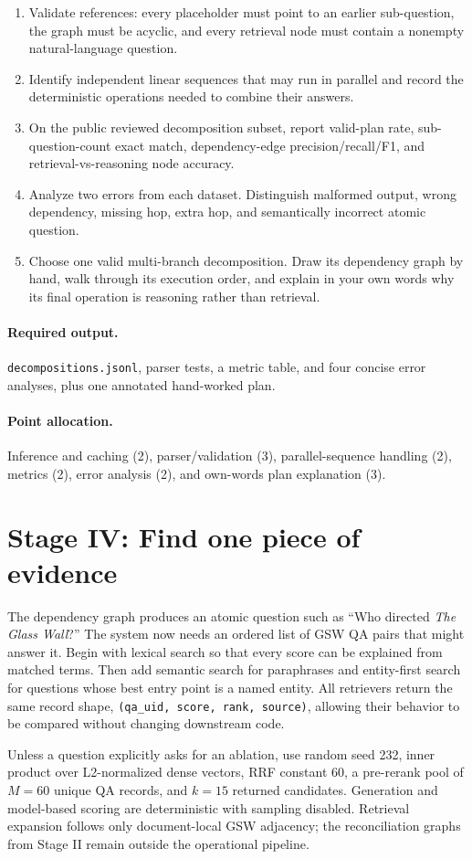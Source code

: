 \documentclass[11pt]{article}
\newcommand{\code}[1]{\texttt{#1}}
\newcommand{\deliverables}{\paragraph{Required output.}}
\newcommand{\grading}{\paragraph{Point allocation.}}
\begin{document}
\begin{enumerate}[label=(\alph*)]
  \item Validate references: every placeholder must point to an earlier
        sub-question, the graph must be acyclic, and every retrieval node must
        contain a nonempty natural-language question.
  \item Identify independent linear sequences that may run in parallel and
        record the deterministic operations needed to combine their answers.
  \item On the public reviewed decomposition subset, report valid-plan rate,
        sub-question-count exact match, dependency-edge precision/recall/F1,
        and retrieval-vs-reasoning node accuracy.
  \item Analyze two errors from each dataset. Distinguish malformed output,
        wrong dependency, missing hop, extra hop, and semantically incorrect
        atomic question.
  \item Choose one valid multi-branch decomposition. Draw its dependency graph
        by hand, walk through its execution order, and explain in your own
        words why its final operation is reasoning rather than retrieval.
\end{enumerate}

\deliverables \code{decompositions.jsonl}, parser tests, a metric table, and
four concise error analyses, plus one annotated hand-worked plan.

\grading Inference and caching (2), parser/validation (3), parallel-sequence
handling (2), metrics (2), error analysis (2), and own-words plan explanation
(3).

\section{Stage IV: Find one piece of evidence}

The dependency graph produces an atomic question such as ``Who directed
\emph{The Glass Wall}?'' The system now needs an ordered list of GSW QA pairs
that might answer it. Begin with lexical search so that every score can be
explained from matched terms. Then add semantic search for paraphrases and
entity-first search for questions whose best entry point is a named entity.
All retrievers return the same record shape,
\code{(qa\_uid, score, rank, source)}, allowing their behavior to be compared
without changing downstream code.

Unless a question explicitly asks for an ablation, use random seed 232,
inner product over L2-normalized dense vectors, RRF constant 60, a pre-rerank
pool of $M=60$ unique QA records, and $k=15$ returned candidates. Generation
and model-based scoring are deterministic with sampling disabled. Retrieval
expansion follows only document-local GSW adjacency; the reconciliation graphs
from Stage II remain outside the operational pipeline.
\end{document}
